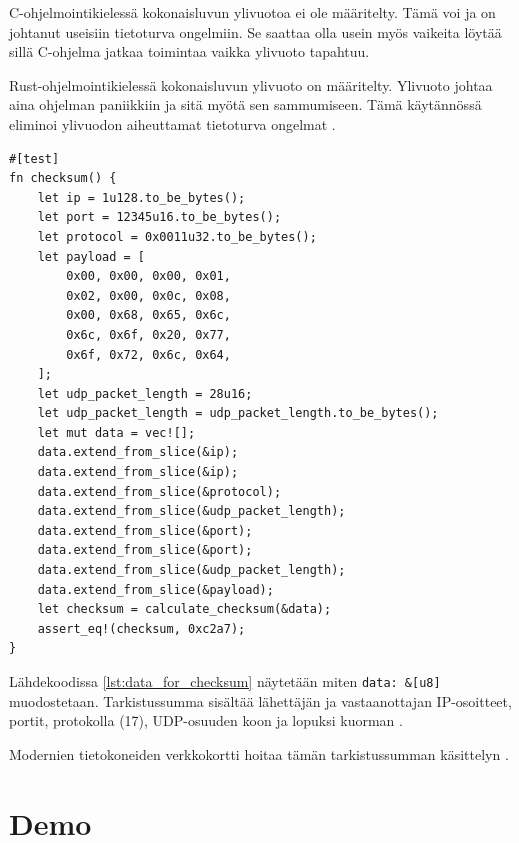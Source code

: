 \documentclass[a4paper,12pt]{article}
\begin{document}
\begin{framed}
    C-ohjelmointikielessä kokonaisluvun ylivuotoa ei ole määritelty. Tämä voi ja on johtanut useisiin tietoturva ongelmiin. Se saattaa olla usein myös vaikeita löytää sillä C-ohjelma jatkaa toimintaa vaikka ylivuoto tapahtuu.\par
    Rust-ohjelmointikielessä kokonaisluvun ylivuoto on määritelty. Ylivuoto johtaa aina ohjelman paniikkiin ja sitä myötä sen sammumiseen. Tämä käytännössä eliminoi ylivuodon aiheuttamat tietoturva ongelmat \cite[ch.~3.2]{rust-book}.
\end{framed}

\begin{minipage}{\linewidth}

\begin{lstlisting}[caption={Tietojen kasaaminen tarkistussummaa varten}, label={lst:data_for_checksum}]
#[test]
fn checksum() {
    let ip = 1u128.to_be_bytes();
    let port = 12345u16.to_be_bytes();
    let protocol = 0x0011u32.to_be_bytes();
    let payload = [
        0x00, 0x00, 0x00, 0x01, 
        0x02, 0x00, 0x0c, 0x08, 
        0x00, 0x68, 0x65, 0x6c, 
        0x6c, 0x6f, 0x20, 0x77, 
        0x6f, 0x72, 0x6c, 0x64,
    ];
    let udp_packet_length = 28u16;
    let udp_packet_length = udp_packet_length.to_be_bytes();
    let mut data = vec![];
    data.extend_from_slice(&ip);
    data.extend_from_slice(&ip);
    data.extend_from_slice(&protocol);
    data.extend_from_slice(&udp_packet_length);
    data.extend_from_slice(&port);
    data.extend_from_slice(&port);
    data.extend_from_slice(&udp_packet_length);
    data.extend_from_slice(&payload);
    let checksum = calculate_checksum(&data);
    assert_eq!(checksum, 0xc2a7);
}
\end{lstlisting}
\end{minipage}

Lähdekoodissa \ref{lst:data_for_checksum} näytetään miten \lstinline{data: &[u8]} muodostetaan. Tarkistussumma sisältää lähettäjän ja vastaanottajan IP-osoitteet, portit, protokolla (17), UDP-osuuden koon ja lopuksi kuorman \cite{RFC-768, protocol-numbers}. \par
    
    Modernien tietokoneiden verkkokortti hoitaa tämän tarkistussumman käsittelyn \cite{TCP/IPLearn}. 

    \section{Demo}\label{sec:demo}
\end{document}
